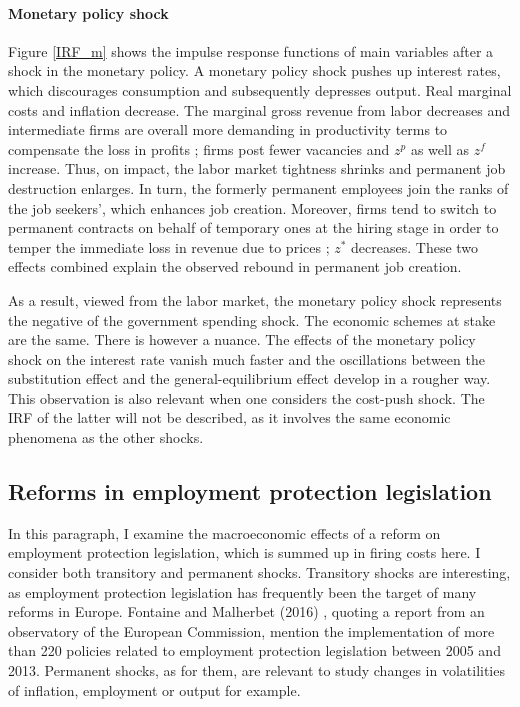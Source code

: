 \documentclass[a4paper]{article}
\begin{document}
\paragraph{Monetary policy shock} Figure \ref{IRF_m} shows the impulse response functions of main variables after a shock in the monetary policy. A monetary policy shock pushes up interest rates, which discourages consumption and subsequently depresses output. Real marginal costs and inflation decrease. The marginal gross revenue from labor decreases and intermediate firms are overall more demanding in productivity terms to compensate the loss in profits ; firms post fewer vacancies and $z^p$ as well as $z^f$ increase. Thus, on impact, the labor market tightness shrinks and permanent job destruction enlarges. In turn, the formerly permanent employees join the ranks of the job seekers', which enhances job creation. Moreover, firms tend to switch to permanent contracts on behalf of temporary ones at the hiring stage in order to temper the immediate loss in revenue due to prices ; $z^*$ decreases. These two effects combined explain the observed rebound in permanent job creation.

As a result, viewed from the labor market, the monetary policy shock represents the negative of the government spending shock. The economic schemes at stake are the same. There is however a nuance. The effects of the monetary policy shock on the interest rate vanish much faster and the oscillations between the substitution effect and the general-equilibrium effect develop in a rougher way. This observation is also relevant when one considers the cost-push shock. The IRF of the latter will not be described, as it involves the same economic phenomena as the other shocks.

\subsection{Reforms in employment protection legislation}

In this paragraph, I examine the macroeconomic effects of a reform on employment protection legislation, which is summed up in firing costs here. I consider both transitory and permanent shocks. Transitory shocks are interesting, as employment protection legislation has frequently been the target of many reforms in Europe. Fontaine and Malherbet (2016) \cite{fontaine2016cdd}, quoting a report from an observatory of the European Commission, mention the implementation of more than 220 policies related to employment protection legislation between 2005 and 2013. Permanent shocks, as for them, are relevant to study changes in volatilities of inflation, employment or output for example.
\end{document}
